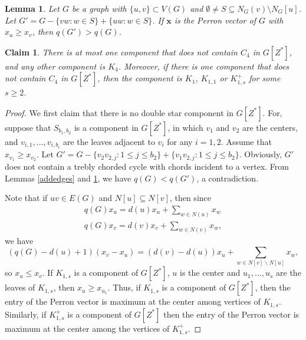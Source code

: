 \documentclass[10pt,a4paper]{amsart}
\newtheorem{lemma}{Lemma}
\newtheorem{claim}{Claim}
\begin{document}
\begin{lemma} \label{perron}
Let $G$ be a graph with $\{u,v\}\subset V(G)$ and $\emptyset\ne S\subseteq N_G(v)\setminus N_G[u]$. Let
$G'=G-\{vw: w\in S\}+\{uw: w\in S\}$. If $\mathbf{x}$ is the Perron vector of $G$ with $x_u\ge x_v$, then $q(G')>q(G)$.
\end{lemma}

\begin{claim}\label{nok4}
There is at most one component that does not contain $C_4$ in $G[Z^*]$, and any other component
is $K_4$.
Moreover, if there is one component that does not contain $C_4$ in $G[Z^*]$, then the component is $K_1$, $K_{1,1}$ or $K_{1,s}^+$ for some $s\ge 2$.
\end{claim}

\begin{proof}
We first claim that there is no double star component in $G[Z^*]$. For, suppose that  $S_{b_1,b_2}$
is a  component in  $G[Z^*]$, in which  $v_1$ and $v_2$ are the centers, and $v_{i,1},\dots,v_{i,b_i}$ are the leaves adjacent to $v_i$ for any $i=1,2$.
Assume that $x_{v_1}\ge x_{v_2}$.
Let $G'=G-\{v_2v_{2,j}:1\le j\le b_{2}\}+\{v_1v_{2,j}:1\le j\le b_{2}\}$.
Obviously, $G'$ does not contain a trebly chorded cycle with chords incident to a vertex.
From Lemmas \ref{addedges} and \ref{perron}, we have $q(G)<q(G')$, a contradiction.

Note that if $uv\in E(G)$ and $N[u]\subseteq N[v]$, then since
\begin{align*}
q(G)x_u=d(u)x_u+\sum_{w\in N(u)}x_w\\
q(G)x_v=d(v)x_v+\sum_{w\in N(v)}x_w,
\end{align*}
we have
\[
\left(q(G)-d(u)+1\right)\left(x_v-x_u\right)=\left(d(v)-d(u)\right)x_u+\sum_{w\in N[v]\backslash N[u]}x_w,
\]
so $x_u\le x_v$. If $K_{1,s}$ is a component of $G[Z^*]$, $u$ is the center and $u_{1},\dots,u_{s}$ are the leaves of $K_{1,s}$, then $x_{u}\ge x_{u_{1}}$. Thus, if $K_{1,s}$ is a component of $G[Z^*]$, then the entry of the Perron vector is maximum  at the center among vertices of $K_{1,s}$. Similarly,
 if  $K_{1,s}^+$ is a component of $G[Z^*]$ then the entry of the Perron vector is maximum at the center among the vertices of $K_{1,s}^+$.





\end{proof}
\end{document}
